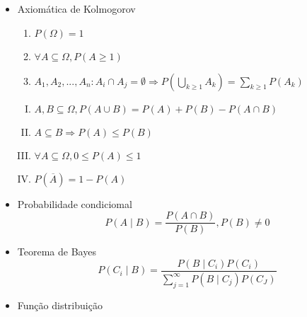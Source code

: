 \begin{multicols}{2}


\begin{itemize}
    \item{Axiomática de Kolmogorov}
        \begin{enumerate}
            \item $P(\Omega) = 1$
            \item $\forall A \subseteq \Omega, P(A \geq 1)$
            \item $A_1, A_2, ..., A_n: A_i \cap A_j = \emptyset \Rightarrow P (\bigcup\limits_{k \geq 1} A_k) = \sum\limits_{k\geq 1} P(A_k)$
        \end{enumerate}
        \begin{enumerate}[I)]
            \item $A, B \subseteq \Omega, P(A \cup B) = P(A) + P(B) - P(A \cap B) $
            \item $A \subseteq B \Rightarrow P(A) \leq P(B)$
            \item $\forall A \subseteq \Omega, 0 \leq P(A) \leq 1$
            \item $P(\overline{A}) = 1 - P(A)$
        \end{enumerate}

    \item{Probabilidade condiciomal}
        $$P(A \mid B) = \frac{P(A \cap B)}{P(B)}, P(B) \neq 0$$

    \item{Teorema de Bayes}
        $$P(C_i \mid B) = \frac{P(B \mid C_i)P(C_i)}{\sum_{j=1}^{\infty} P(B \mid C_j)P(C_J)}$$

    \item{Função distribuição}
    
    
\end{itemize}

\end{multicols}